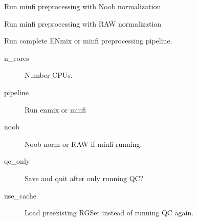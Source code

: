 \documentclass[letterpaper,10pt,english]{sphinxmanual}
\begin{document}
\begin{fulllineitems}

\begin{fulllineitems}
\label{\detokenize{index:pymethylprocess.PreProcessDataTypes.PreProcessIDAT.preprocessNoob}}
Run minfi preprocessing with Noob normalization

\end{fulllineitems}


\begin{fulllineitems}
\label{\detokenize{index:pymethylprocess.PreProcessDataTypes.PreProcessIDAT.preprocessRAW}}
Run minfi preprocessing with RAW normalization

\end{fulllineitems}


\begin{fulllineitems}
\label{\detokenize{index:pymethylprocess.PreProcessDataTypes.PreProcessIDAT.preprocess_enmix_pipeline}}
Run complete ENmix or minfi preprocessing pipeline.
\begin{description}
\item[{n\_cores}] \leavevmode
Number CPUs.

\item[{pipeline}] \leavevmode
Run enmix or minfi

\item[{noob}] \leavevmode
Noob norm or RAW if minfi running.

\item[{qc\_only}] \leavevmode
Save and quit after only running QC?

\item[{use\_cache}] \leavevmode
Load preexisting RGSet instead of running QC again.


\end{description}
\end{fulllineitems}
\end{fulllineitems}
\end{document}
